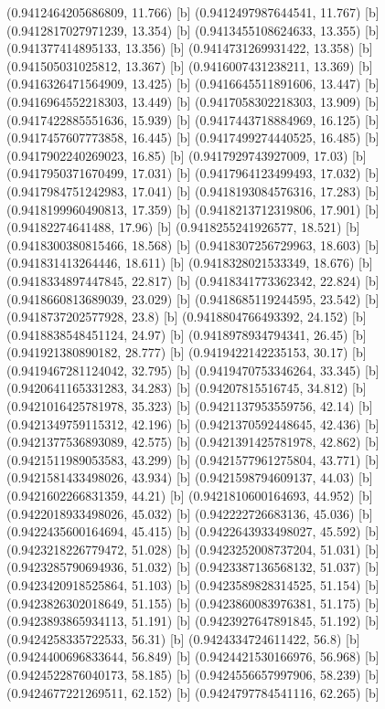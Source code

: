 {{{(0.9412464205686809, 11.766) [b] 
(0.9412497987644541, 11.767) [b] 
(0.9412817027971239, 13.354) [b] 
(0.9413455108624633, 13.355) [b] 
(0.941377414895133, 13.356) [b] 
(0.9414731269931422, 13.358) [b] 
(0.941505031025812, 13.367) [b] 
(0.9416007431238211, 13.369) [b] 
(0.9416326471564909, 13.425) [b] 
(0.9416645511891606, 13.447) [b] 
(0.9416964552218303, 13.449) [b] 
(0.9417058302218303, 13.909) [b] 
(0.9417422885551636, 15.939) [b] 
(0.9417443718884969, 16.125) [b] 
(0.9417457607773858, 16.445) [b] 
(0.9417499274440525, 16.485) [b] 
(0.9417902240269023, 16.85) [b] 
(0.9417929743927009, 17.03) [b] 
(0.9417950371670499, 17.031) [b] 
(0.9417964123499493, 17.032) [b] 
(0.9417984751242983, 17.041) [b] 
(0.9418193084576316, 17.283) [b] 
(0.9418199960490813, 17.359) [b] 
(0.9418213712319806, 17.901) [b] 
(0.94182274641488, 17.96) [b] 
(0.9418255241926577, 18.521) [b] 
(0.9418300380815466, 18.568) [b] 
(0.9418307256729963, 18.603) [b] 
(0.941831413264446, 18.611) [b] 
(0.9418328021533349, 18.676) [b] 
(0.9418334897447845, 22.817) [b] 
(0.9418341773362342, 22.824) [b] 
(0.9418660813689039, 23.029) [b] 
(0.9418685119244595, 23.542) [b] 
(0.9418737202577928, 23.8) [b] 
(0.9418804766493392, 24.152) [b] 
(0.9418838548451124, 24.97) [b] 
(0.9418978934794341, 26.45) [b] 
(0.941921380890182, 28.777) [b] 
(0.9419422142235153, 30.17) [b] 
(0.9419467281124042, 32.795) [b] 
(0.9419470753346264, 33.345) [b] 
(0.9420641165331283, 34.283) [b] 
(0.94207815516745, 34.812) [b] 
(0.9421016425781978, 35.323) [b] 
(0.9421137953559756, 42.14) [b] 
(0.9421349759115312, 42.196) [b] 
(0.9421370592448645, 42.436) [b] 
(0.9421377536893089, 42.575) [b] 
(0.9421391425781978, 42.862) [b] 
(0.9421511989053583, 43.299) [b] 
(0.9421577961275804, 43.771) [b] 
(0.9421581433498026, 43.934) [b] 
(0.9421598794609137, 44.03) [b] 
(0.9421602266831359, 44.21) [b] 
(0.9421810600164693, 44.952) [b] 
(0.9422018933498026, 45.032) [b] 
(0.942222726683136, 45.036) [b] 
(0.9422435600164694, 45.415) [b] 
(0.9422643933498027, 45.592) [b] 
(0.9423218226779472, 51.028) [b] 
(0.9423252008737204, 51.031) [b] 
(0.9423285790694936, 51.032) [b] 
(0.9423387136568132, 51.037) [b] 
(0.9423420918525864, 51.103) [b] 
(0.9423589828314525, 51.154) [b] 
(0.9423826302018649, 51.155) [b] 
(0.9423860083976381, 51.175) [b] 
(0.9423893865934113, 51.191) [b] 
(0.9423927647891845, 51.192) [b] 
(0.9424258335722533, 56.31) [b] 
(0.9424334724611422, 56.8) [b] 
(0.9424400696833644, 56.849) [b] 
(0.9424421530166976, 56.968) [b] 
(0.9424522876040173, 58.185) [b] 
(0.9424556657997906, 58.239) [b] 
(0.9424677221269511, 62.152) [b] 
(0.9424797784541116, 62.265) [b] 
}}}
